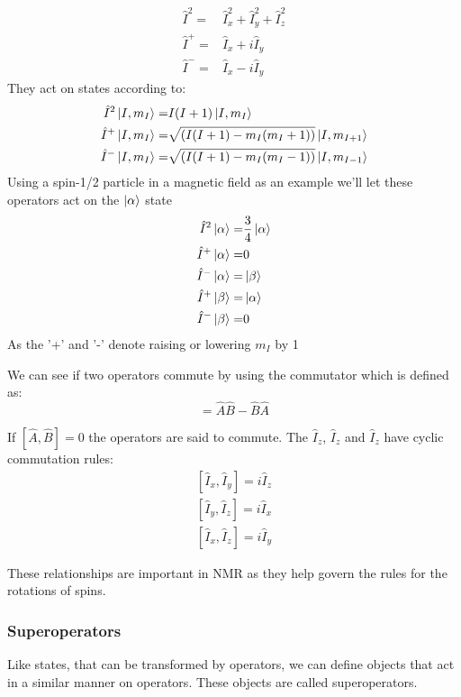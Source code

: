 \begin{align}
  \hat{I}^2 =& \hat{I}_x^2 + \hat{I}_y^2 + \hat{I}_z^2\\
  \hat{I}^+ =& \hat{I}_x + i\hat{I}_y\\
  \hat{I}^- =& \hat{I}_x - i\hat{I}_y
\end{align}
They act on states according to:
\begin{align}
  \hat{I}^2\ket{I,m_I} =& I(I+1)\ket{I, m_I}\\
  \hat{I}^+\ket{I,m_I} =& \sqrt{(I(I+1)-m_I(m_I+1))}\ket{I,m_{I+1}}\\
  \hat{I}^-\ket{I,m_I} =& \sqrt{(I(I+1)-m_I(m_I-1))}\ket{I,m_{I-1}}
\end{align}
Using a spin-1/2 particle in a magnetic field as an example we'll let these operators act on the $\ket{\alpha}$ state
\begin{align}
  \hat{I}^2\ket{\alpha} =& \frac{3}{4}\ket{\alpha}\\
  \hat{I}^+\ket{\alpha} =& 0\\
  \hat{I}^-\ket{\alpha} =& \ket{\beta}\\
  \hat{I}^+\ket{\beta} =& \ket{\alpha}\\
  \hat{I}^-\ket{\beta} =& 0
\end{align}
As the '+' and '-' denote raising or lowering $m_I$ by 1


We can see if two operators commute by using the commutator which is defined as:
\begin{equation}
  [\hat{A},\hat{B}] = \hat{A}\hat{B} - \hat{B}\hat{A}
\end{equation}

If $[\hat{A},\hat{B}] = 0$ the operators are said to commute. The $\hat{I}_z$, $\hat{I}_z$ and $\hat{I}_z$
have cyclic commutation rules:
\begin{align}\label{eqn:commutator}
  [\hat{I}_x,\hat{I}_y] = i\hat{I}_z\\
  [\hat{I}_y,\hat{I}_z] = i\hat{I}_x\\
  [\hat{I}_x,\hat{I}_z] = i\hat{I}_y
\end{align}

These relationships are important in NMR as they help govern the rules for the rotations of spins.

\subsubsection{Superoperators}

Like states, that can be transformed by operators, we can define objects that act in a similar manner on operators. These objects are called superoperators.

